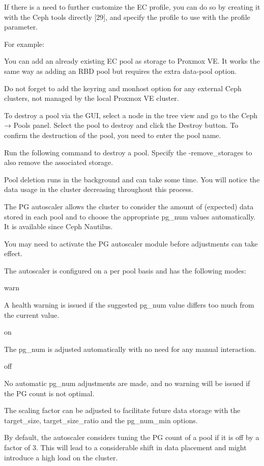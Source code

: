 If there is a need to further customize the EC profile, you can do so by creating it with the Ceph tools directly [29], and specify the profile to use with the profile parameter.

For example:

You can add an already existing EC pool as storage to Proxmox VE. It works the same way as adding an RBD pool but requires the extra data-pool option.

Do not forget to add the keyring and monhost option for any external Ceph clusters, not managed by the local Proxmox VE cluster.

To destroy a pool via the GUI, select a node in the tree view and go to the Ceph → Pools panel. Select the pool to destroy and click the Destroy button. To confirm the destruction of the pool, you need to enter the pool name.

Run the following command to destroy a pool. Specify the -remove_storages to also remove the associated storage.

Pool deletion runs in the background and can take some time. You will notice the data usage in the cluster decreasing throughout this process.

The PG autoscaler allows the cluster to consider the amount of (expected) data stored in each pool and to choose the appropriate pg_num values automatically. It is available since Ceph Nautilus.

You may need to activate the PG autoscaler module before adjustments can take effect.

The autoscaler is configured on a per pool basis and has the following modes:

warn

A health warning is issued if the suggested pg_num value differs too much from the current value.

on

The pg_num is adjusted automatically with no need for any manual interaction.

off

No automatic pg_num adjustments are made, and no warning will be issued if the PG count is not optimal.

The scaling factor can be adjusted to facilitate future data storage with the target_size, target_size_ratio and the pg_num_min options.

By default, the autoscaler considers tuning the PG count of a pool if it is off by a factor of 3. This will lead to a considerable shift in data placement and might introduce a high load on the cluster.

